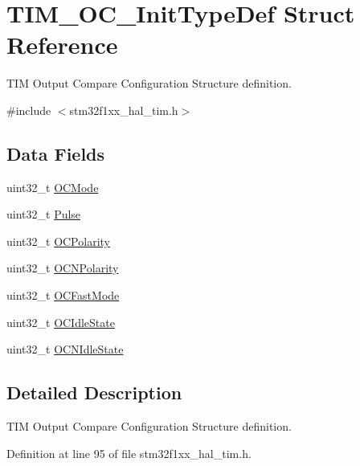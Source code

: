 \hypertarget{struct_t_i_m___o_c___init_type_def}{}\section{T\+I\+M\+\_\+\+O\+C\+\_\+\+Init\+Type\+Def Struct Reference}
\label{struct_t_i_m___o_c___init_type_def}


T\+IM Output Compare Configuration Structure definition.  




{\ttfamily \#include $<$stm32f1xx\+\_\+hal\+\_\+tim.\+h$>$}

\subsection*{Data Fields}
\begin{DoxyCompactItemize}
\item 
uint32\+\_\+t \hyperlink{struct_t_i_m___o_c___init_type_def_add4ac9143086c89effbede5c54e958bf}{O\+C\+Mode}
\item 
uint32\+\_\+t \hyperlink{struct_t_i_m___o_c___init_type_def_a5251c3bce4ca5baf013bc0ace0865a4c}{Pulse}
\item 
uint32\+\_\+t \hyperlink{struct_t_i_m___o_c___init_type_def_a781c7dae9dec8b6c974b1bdf591b77e7}{O\+C\+Polarity}
\item 
uint32\+\_\+t \hyperlink{struct_t_i_m___o_c___init_type_def_a978da9dd7cda80eb5fe8d04828b9bbcc}{O\+C\+N\+Polarity}
\item 
uint32\+\_\+t \hyperlink{struct_t_i_m___o_c___init_type_def_aadc3d763f52920adcd0150ffbad1043a}{O\+C\+Fast\+Mode}
\item 
uint32\+\_\+t \hyperlink{struct_t_i_m___o_c___init_type_def_a57bb589da3cf2b39b727fe4a3d334ab3}{O\+C\+Idle\+State}
\item 
uint32\+\_\+t \hyperlink{struct_t_i_m___o_c___init_type_def_a78d21970d78c1e3e328692743406ba25}{O\+C\+N\+Idle\+State}
\end{DoxyCompactItemize}


\subsection{Detailed Description}
T\+IM Output Compare Configuration Structure definition. 

Definition at line 95 of file stm32f1xx\+\_\+hal\+\_\+tim.\+h.




